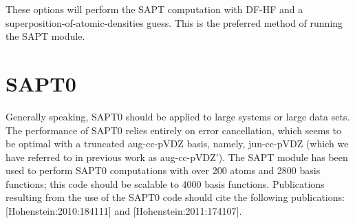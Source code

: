 \documentclass[letterpaper,10pt,english]{sphinxmanual}
\begin{document}
These options will perform the SAPT computation with DF-HF and a
superposition-of-atomic-densities guess. This is the preferred method of
running the SAPT module.


\section{SAPT0}
\label{index:sapt0}
Generally speaking, SAPT0 should be applied to large systems or large data
sets. The performance of SAPT0 relies entirely on error cancellation, which
seems to be optimal with a truncated aug-cc-pVDZ basis, namely,
jun-cc-pVDZ (which we have referred to in previous work as
aug-cc-pVDZ').
The SAPT module has been used to perform SAPT0 computations with over
200 atoms and 2800 basis functions; this code should be scalable to 4000
basis functions. Publications resulting from the use of the SAPT0 code
should cite the following publications: {[}Hohenstein:2010:184111{]} and
{[}Hohenstein:2011:174107{]}.
\end{document}
